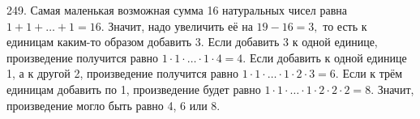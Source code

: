 249. Самая маленькая возможная сумма 16 натуральных чисел равна $1+1+\ldots+1=16.$ Значит, надо увеличить её на $19-16=3,$ то есть к единицам каким-то образом добавить 3. Если добавить 3 к одной единице, произведение получится равно $1\cdot1\cdot\ldots\cdot1\cdot4=4.$ Если добавить к одной единице 1, а к другой 2, произведение получится равно $1\cdot1\cdot\ldots\cdot1\cdot2\cdot3=6.$ Если к трём единицам добавить по 1, произведение будет равно $1\cdot1\cdot\ldots\cdot1\cdot2\cdot2\cdot2=8.$ Значит, произведение могло быть равно 4, 6 или 8.\\
